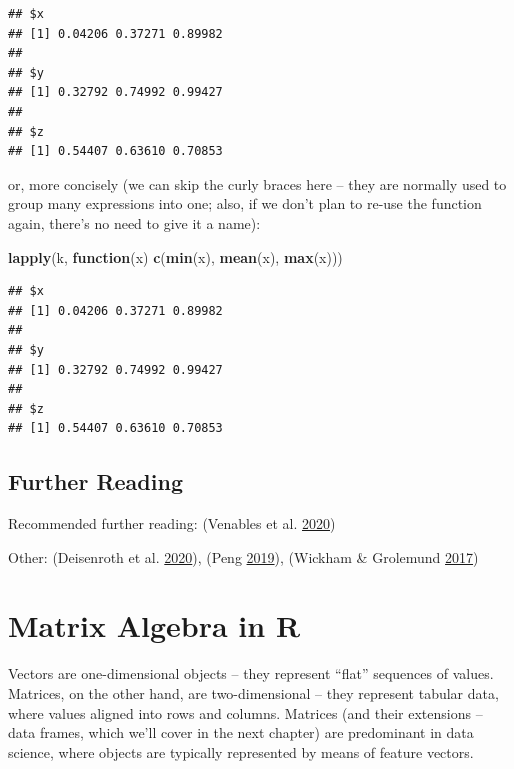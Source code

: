 \documentclass[10pt,b5paper,krantz1]{krantz}
\newenvironment{Shaded}{\begin{snugshade}}{\end{snugshade}}
\newcommand{\ControlFlowTok}[1]{\textcolor[rgb]{0.27,0.27,0.27}{\textbf{#1}}}
\newcommand{\KeywordTok}[1]{\textcolor[rgb]{0.27,0.27,0.27}{\textbf{#1}}}
\newcommand{\NormalTok}[1]{#1}
\begin{document}
\begin{verbatim}
## $x
## [1] 0.04206 0.37271 0.89982
## 
## $y
## [1] 0.32792 0.74992 0.99427
## 
## $z
## [1] 0.54407 0.63610 0.70853
\end{verbatim}

or, more concisely (we can skip the curly braces here -- they are
normally used to group many expressions into one; also, if we don't plan
to re-use the function again, there's no need to give it a name):

\begin{Shaded}
\begin{Highlighting}[]
\KeywordTok{lapply}\NormalTok{(k, }\ControlFlowTok{function}\NormalTok{(x) }\KeywordTok{c}\NormalTok{(}\KeywordTok{min}\NormalTok{(x), }\KeywordTok{mean}\NormalTok{(x), }\KeywordTok{max}\NormalTok{(x)))}
\end{Highlighting}
\end{Shaded}

\begin{verbatim}
## $x
## [1] 0.04206 0.37271 0.89982
## 
## $y
## [1] 0.32792 0.74992 0.99427
## 
## $z
## [1] 0.54407 0.63610 0.70853
\end{verbatim}

\hypertarget{further-reading-9}{%
\section{Further Reading}\label{further-reading-9}}

Recommended further reading: (Venables et al. \protect\hyperlink{ref-Rintro}{2020})

Other: (Deisenroth et al. \protect\hyperlink{ref-mml}{2020}), (Peng \protect\hyperlink{ref-rprogdatascience}{2019}), (Wickham \& Grolemund \protect\hyperlink{ref-r4ds}{2017})

\hypertarget{matrix-algebra-in-r}{%
\chapter{Matrix Algebra in R}\label{matrix-algebra-in-r}}

Vectors are one-dimensional objects -- they represent ``flat'' sequences of values.
Matrices, on the other hand, are two-dimensional -- they represent tabular data,
where values aligned into rows and columns. Matrices (and their extensions --
data frames, which we'll cover in the next chapter) are predominant
in data science, where objects are typically represented by means
of feature vectors.
\end{document}
